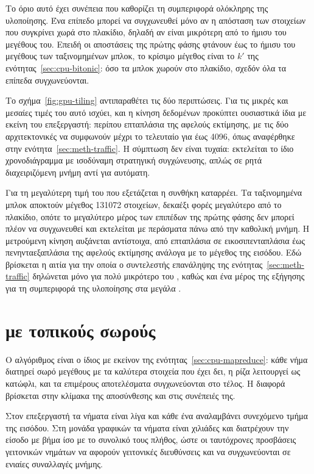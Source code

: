 Το όριο αυτό έχει συνέπεια που καθορίζει τη συμπεριφορά ολόκληρης της
υλοποίησης. Ένα επίπεδο μπορεί να συγχωνευθεί μόνο αν η απόσταση των στοιχείων
που συγκρίνει χωρά στο πλακίδιο, δηλαδή αν είναι μικρότερη από το ήμισυ του
μεγέθους του. Επειδή οι αποστάσεις της πρώτης φάσης φτάνουν έως το ήμισυ του
μεγέθους των ταξινομημένων μπλοκ, το κρίσιμο μέγεθος είναι το $k'$ της
ενότητας~\ref{sec:cpu-bitonic}: όσο τα μπλοκ χωρούν στο πλακίδιο, σχεδόν όλα τα
επίπεδα συγχωνεύονται.

Το σχήμα~\ref{fig:gpu-tiling} αντιπαραθέτει τις δύο περιπτώσεις. Για τις μικρές και μεσαίες τιμές του  αυτό ισχύει, και η κίνηση δεδομένων
προκύπτει ουσιαστικά ίδια με εκείνη του επεξεργαστή: περίπου επταπλάσια της
αφελούς εκτίμησης, με τις δύο αρχιτεκτονικές να συμφωνούν μέχρι το τελευταίο
 για  έως 4096, όπως αναφέρθηκε στην
ενότητα~\ref{sec:meth-traffic}. Η σύμπτωση δεν είναι τυχαία: εκτελείται το ίδιο
χρονοδιάγραμμα με ισοδύναμη στρατηγική συγχώνευσης, απλώς σε ρητά
διαχειριζόμενη μνήμη αντί για αυτόματη.

Για τη μεγαλύτερη τιμή του  που εξετάζεται η συνθήκη καταρρέει. Τα
ταξινομημένα μπλοκ αποκτούν μέγεθος 131072 στοιχείων, δεκαέξι φορές μεγαλύτερο
από το πλακίδιο, οπότε το μεγαλύτερο μέρος των επιπέδων της πρώτης φάσης δεν
μπορεί πλέον να συγχωνευθεί και εκτελείται με περάσματα πάνω από την καθολική
μνήμη. Η μετρούμενη κίνηση αυξάνεται αντίστοιχα, από επταπλάσια σε
εικοσιπενταπλάσια έως πενηνταεξαπλάσια της αφελούς εκτίμησης ανάλογα με το
μέγεθος της εισόδου. Εδώ βρίσκεται η αιτία για την οποία ο συντελεστής
επανάληψης της ενότητας~\ref{sec:meth-traffic} δηλώνεται μόνο για  πολύ
μικρότερο του , καθώς και ένα μέρος της εξήγησης για τη συμπεριφορά της
υλοποίησης στα μεγάλα .



\section{ με τοπικούς σωρούς}
\label{sec:gpu-mapreduce}

Ο αλγόριθμος είναι ο ίδιος με εκείνον της ενότητας~\ref{sec:cpu-mapreduce}: κάθε
νήμα διατηρεί σωρό μεγέθους  με τα καλύτερα στοιχεία που έχει δει, η ρίζα
λειτουργεί ως κατώφλι, και τα επιμέρους αποτελέσματα συγχωνεύονται στο τέλος. Η
διαφορά βρίσκεται στην κλίμακα της αποσύνθεσης και στις συνέπειές της.

Στον επεξεργαστή τα νήματα είναι λίγα και κάθε ένα αναλαμβάνει συνεχόμενο τμήμα
της εισόδου. Στη μονάδα γραφικών τα νήματα είναι χιλιάδες και διατρέχουν την
είσοδο με βήμα ίσο με το συνολικό τους πλήθος, ώστε οι ταυτόχρονες προσβάσεις
γειτονικών νημάτων να αφορούν γειτονικές διευθύνσεις και να συγχωνεύονται σε
ενιαίες συναλλαγές μνήμης.

